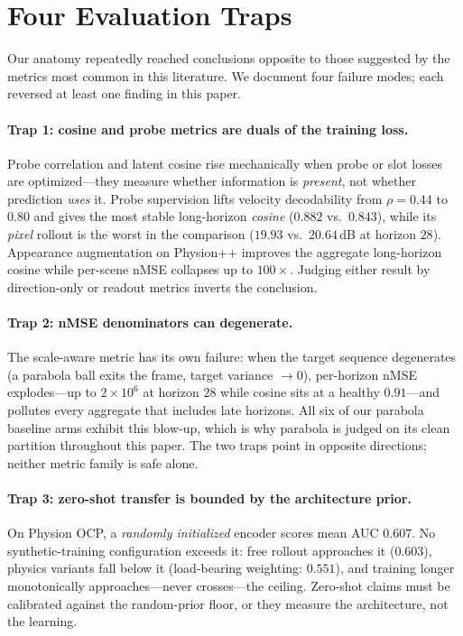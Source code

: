 \section{Four Evaluation Traps}
\label{sec:traps}

Our anatomy repeatedly reached conclusions opposite to those suggested by the metrics most common in this literature. We document four failure modes; each reversed at least one finding in this paper.

\paragraph{Trap 1: cosine and probe metrics are duals of the training loss.}
Probe correlation and latent cosine rise mechanically when probe or slot losses are optimized---they measure whether information is \emph{present}, not whether prediction \emph{uses} it. Probe supervision lifts velocity decodability from $\rho{=}0.44$ to $0.80$ and gives the most stable long-horizon \emph{cosine} ($0.882$ vs.\ $0.843$), while its \emph{pixel} rollout is the worst in the comparison ($19.93$ vs.\ $20.64$\,dB at horizon $28$). Appearance augmentation on Physion++ improves the aggregate long-horizon cosine while per-scene nMSE collapses up to $100\times$. Judging either result by direction-only or readout metrics inverts the conclusion.

\paragraph{Trap 2: nMSE denominators can degenerate.}
The scale-aware metric has its own failure: when the target sequence degenerates (a parabola ball exits the frame, target variance ${\to}0$), per-horizon nMSE explodes---up to $2{\times}10^{6}$ at horizon $28$ while cosine sits at a healthy $0.91$---and pollutes every aggregate that includes late horizons. All six of our parabola baseline arms exhibit this blow-up, which is why parabola is judged on its clean \rmood{} partition throughout this paper. The two traps point in opposite directions; neither metric family is safe alone.

\paragraph{Trap 3: zero-shot transfer is bounded by the architecture prior.}
On Physion OCP, a \emph{randomly initialized} encoder scores mean AUC $0.607$. No synthetic-training configuration exceeds it: free rollout approaches it ($0.603$), physics variants fall below it (load-bearing weighting: $0.551$), and training longer monotonically approaches---never crosses---the ceiling. Zero-shot claims must be calibrated against the random-prior floor, or they measure the architecture, not the learning.

